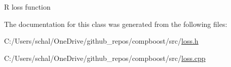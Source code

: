 {\ttfamily R} loss function 



The documentation for this class was generated from the following files\+:\begin{DoxyCompactItemize}
\item 
C\+:/\+Users/schal/\+One\+Drive/github\+\_\+repos/compboost/src/\mbox{\hyperlink{loss_8h}{loss.\+h}}\item 
C\+:/\+Users/schal/\+One\+Drive/github\+\_\+repos/compboost/src/\mbox{\hyperlink{loss_8cpp}{loss.\+cpp}}\end{DoxyCompactItemize}
